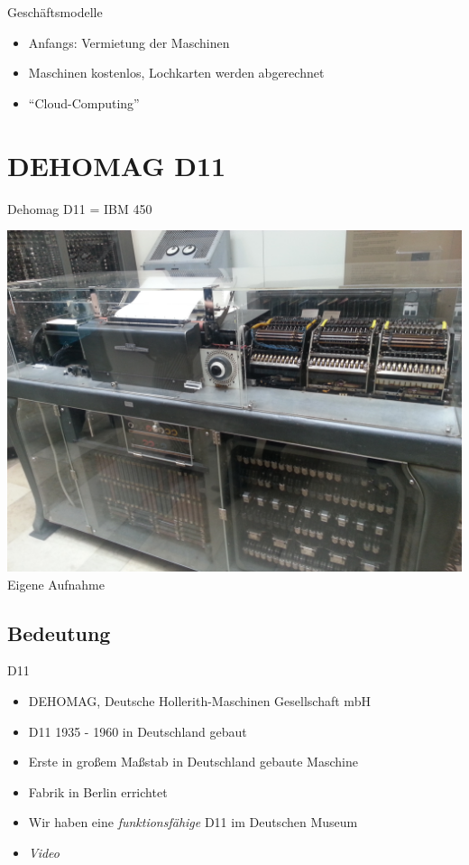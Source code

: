 \documentclass[EU2]{beamer}
\begin{document}
\begin{frame}{Geschäftsmodelle}
  \begin{itemize}
    \item Anfangs: Vermietung der Maschinen
    \item Maschinen kostenlos, Lochkarten werden abgerechnet
    \item \enquote{Cloud-Computing}
  \end{itemize}
\end{frame}

\section{DEHOMAG D11}

\begin{frame}[plain]{Dehomag D11 = IBM 450}
  \begin{center}
    \includegraphics[height=0.95\textheight]{d11}\\
    \tiny{Eigene Aufnahme}
  \end{center}
\end{frame}

\subsection{Bedeutung}

\begin{frame}{D11}
  \begin{itemize}
    \item DEHOMAG, Deutsche Hollerith-Maschinen Gesellschaft mbH
    \item D11 1935 - 1960 in Deutschland gebaut
    \item Erste in großem Maßstab in Deutschland gebaute Maschine
    \item Fabrik in Berlin errichtet
    \item Wir haben eine \emph{funktionsfähige} D11 im Deutschen Museum
    \item \emph{Video}
  \end{itemize}
\end{frame}
\end{document}
